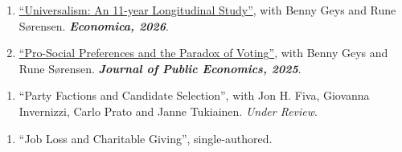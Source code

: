 

\begin{enumerate}[resume]
    \item \href{https://onlinelibrary.wiley.com/doi/full/10.1111/ecca.70058}{``Universalism: An 11-year Longitudinal Study''}, with Benny Geys and Rune Sørensen. \textit{\textbf{Economica, 2026}}.
    \item \href{https://www.sciencedirect.com/science/article/pii/S004727272500177X}{``Pro-Social Preferences and the Paradox of Voting''}, with Benny Geys and Rune Sørensen. \textit{\textbf{Journal of Public Economics, 2025}}.
\end{enumerate}

\begin{enumerate}[resume]
    \item ``Party Factions and Candidate Selection'', with Jon H. Fiva, Giovanna Invernizzi, Carlo Prato and Janne Tukiainen. \textit{Under Review}.
\end{enumerate}

\begin{enumerate}[resume]
    \item ``Job Loss and Charitable Giving'', single-authored.
\end{enumerate}
